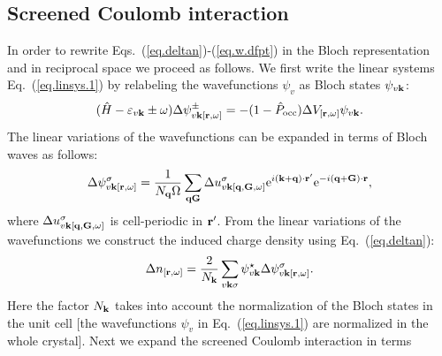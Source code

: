 \documentclass[twocolumn,prb,showpacs,superscriptaddress]{revtex4}
\def\s1{\hspace{0.5cm}}
\def\s2{\hspace{1cm}}
\def\w{\omega}
\def\H{\hat{H}}
\def\P{\hat{P}_{\rm occ}}
\def\E{\varepsilon}
\def\q{{\bf q}}
\def\s{\sigma}
\def\k{{\bf k}}
\def\G{{\bf G}}
\def\Gp{{\bf G^\prime}}
\def\r{{\bf r}}
\def\rp{{\bf r^\prime}}
\begin{document}

%
%
%

\subsection{Screened Coulomb interaction}\label{sec.coulomb.g}

In order to rewrite Eqs.\ (\ref{eq.deltan})-(\ref{eq.w.dfpt}) in
the Bloch representation and in reciprocal space we proceed as follows.
We first write the linear systems Eq.\ (\ref{eq.linsys.1})
by relabeling the wavefunctions $\psi_v$ as Bloch states $\psi_{v\k}$:
  \begin{equation}\label{eq.linsys.3}
  (\H-\E_{v\k}\pm\w) \Delta \psi^\pm_{v\k[\r,\w]}  = -(1-\P)  \Delta V_{[\r,\w]} \psi_{v\k}.
  \end{equation}
The linear variations of the wavefunctions can be expanded in terms
of Bloch waves as follows:
  \begin{equation}\label{eq123}
  \Delta \psi^\sigma_{v\k[\r,\w]} = \frac{1}{N_\q\Omega} \sum_{\q\G} \Delta u^\sigma_{v\k[\q,\G,\w]}
  {\rm e}^{i(\k+\q)\cdot\rp} {\rm e}^{-i(\q+\G)\cdot\r},
  \end{equation}
where $\Delta u^\sigma_{v\k[\q,\G,\w]}$ is cell-periodic in $\rp$.
From the linear variations of the wavefunctions we construct the
induced charge density using Eq.\ (\ref{eq.deltan}):
  \begin{equation}\label{eq.ch}
  \Delta n_{[\r,\w]} = \frac{2}{N_\k}\sum_{v\k\s} \psi_{v\k}^\star  \Delta \psi^\s_{v\k[\r,\w]}.
  \end{equation}
Here the factor $N_\k$ takes into account the normalization of
the Bloch states in the unit cell [the 
wavefunctions $\psi_v$ in Eq.\ (\ref{eq.linsys.1}) are normalized 
in the whole crystal].
Next we expand the screened Coulomb interaction in terms
\end{document}

